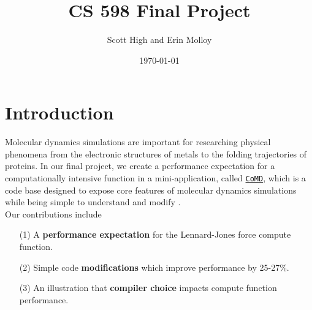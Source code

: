\documentclass[12pt]{article}
\title{CS 598 Final Project}
\author{Scott High and Erin Molloy}
\date{\today}
\begin{document}
\maketitle

\section{Introduction}
Molecular dynamics simulations are important for researching physical phenomena 
from the electronic structures of metals to the folding trajectories of proteins. 
In our final project, we create a performance expectation for a computationally
intensive function in a mini-application, called \href{https://github.com/exmatex/CoMD}{\texttt{CoMD}}, 
which is a code base designed to expose core features of molecular dynamics simulations
while being simple to understand and modify \cite{CoMD}. \\
 Our contributions include
\begin{itemize}
    \item [(1)] A {\bf performance expectation} for the Lennard-Jones force compute function.
    \item [(2)] Simple code {\bf modifications} which improve performance by 25-27\%.
    \item [(3)] An illustration that {\bf compiler choice} impacts compute function performance.
\end{itemize}
\end{document}
